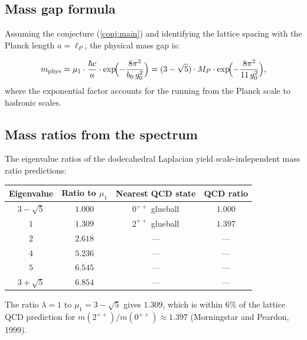 \documentclass[12pt,a4paper]{article}
\theoremstyle{definition}
\theoremstyle{remark}
\begin{document}
\subsection{Mass gap formula}\label{ssec:mgformula}

Assuming the conjecture (\cref{conj:main}) and identifying the lattice
spacing with the Planck length $a = \ell_P$, the physical mass gap is:

\begin{equation}\label{eq:physgap}
  m_{\text{phys}} = \mu_1 \cdot \frac{\hbar c}{a} \cdot
  \exp\!\Bigl(-\frac{8\pi^2}{b_0\, g_0^2}\Bigr)
  = (3 - \sqrt{5}) \cdot M_P \cdot
  \exp\!\Bigl(-\frac{8\pi^2}{11\, g_0^2}\Bigr),
\end{equation}
where the exponential factor accounts for the running from the Planck scale
to hadronic scales.

\subsection{Mass ratios from the spectrum}\label{ssec:massratios}

The eigenvalue ratios of the dodecahedral Laplacian yield
scale-independent mass ratio predictions:

\begin{center}
\begin{tabular}{cccc}
\toprule
\textbf{Eigenvalue} & \textbf{Ratio to $\mu_1$} &
\textbf{Nearest QCD state} & \textbf{QCD ratio} \\
\midrule
$3 - \sqrt{5}$    & $1.000$  & $0^{++}$ glueball  & $1.000$ \\
$1$                & $1.309$  & $2^{++}$ glueball  & $1.397$ \\
$2$                & $2.618$  & ---                 & --- \\
$4$                & $5.236$  & ---                 & --- \\
$5$                & $6.545$  & ---                 & --- \\
$3 + \sqrt{5}$     & $6.854$  & ---                 & --- \\
\bottomrule
\end{tabular}
\end{center}

The ratio $\lambda = 1$ to $\mu_1 = 3-\sqrt{5}$ gives $1.309$, which
is within $6\%$ of the lattice QCD prediction for $m(2^{++})/m(0^{++})
\approx 1.397$ (Morningstar and Peardon, 1999).

\end{document}
